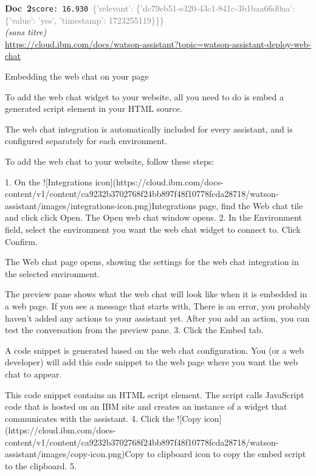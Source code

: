 \documentclass[a4paper,11pt]{article}
\begin{document}
\begin{docenv}
{\footnotesize\textcolor{doccolor}{\textbf{Doc~2}}}\hfill{\tiny\texttt{score:~16.930}}\ {\tiny\textcolor{gray}{\{'relevant': \{'dc79eb51-e320-43c1-841c-3b1baa66d0aa': \{'value': 'yes', 'timestamp': 1723255119\}\}\}}}\\[3pt]
{\small\textit{(sans titre)}}\\[2pt]
{\tiny\url{https://cloud.ibm.com/docs/watson-assistant?topic=watson-assistant-deploy-web-chat}}\\[4pt]
{\footnotesize 
Embedding the web chat on your page 

To add the web chat widget to your website, all you need to do is embed a generated script element in your HTML source.

The web chat integration is automatically included for every assistant, and is configured separately for each environment.

To add the web chat to your website, follow these steps:



1. On the ![Integrations icon](https://cloud.ibm.com/docs-content/v1/content/ca9232b3702768f24bb897f48f10778fcda28718/watson-assistant/images/integrations-icon.png)Integrations page, find the Web chat tile and click click Open. The Open web chat window opens.
2. In the Environment field, select the environment you want the web chat widget to connect to. Click Confirm.

The Web chat page opens, showing the settings for the web chat integration in the selected environment.

The preview pane shows what the web chat will look like when it is embedded in a web page. If you see a message that starts with, There is an error, you probably haven't added any actions to your assistant yet. After you add an action, you can test the conversation from the preview pane.
3. Click the Embed tab.

A code snippet is generated based on the web chat configuration. You (or a web developer) will add this code snippet to the web page where you want the web chat to appear.

This code snippet contains an HTML script element. The script calls JavaScript code that is hosted on an IBM site and creates an instance of a widget that communicates with the assistant.
4. Click the ![Copy icon](https://cloud.ibm.com/docs-content/v1/content/ca9232b3702768f24bb897f48f10778fcda28718/watson-assistant/images/copy-icon.png)Copy to clipboard icon to copy the embed script to the clipboard.
5.}
\end{docenv}
\end{document}
